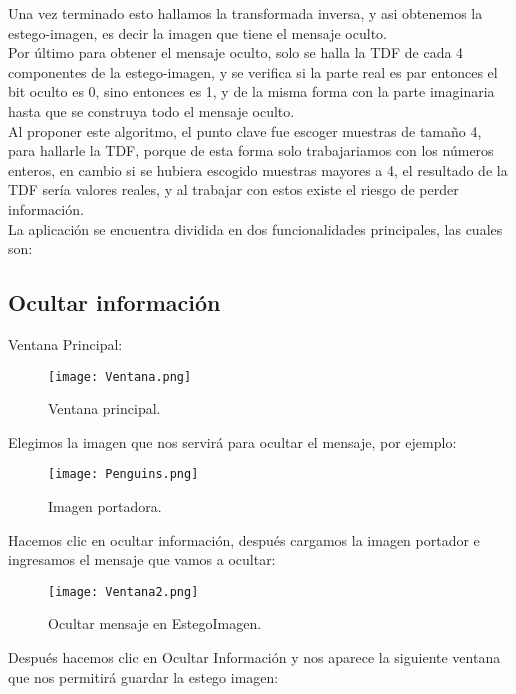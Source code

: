 \documentclass[a4paper]{article}
\begin{document}
Una vez terminado esto hallamos la transformada inversa, y asi obtenemos la estego-imagen, es decir la imagen que tiene el mensaje oculto.\\

Por último para obtener el mensaje oculto, solo se halla la TDF de cada 4 componentes de la estego-imagen, y se verifica si la parte real es par entonces el bit oculto es 0, sino entonces es 1, y de la misma forma con la parte imaginaria hasta que se construya todo el mensaje oculto.\\

Al proponer este algoritmo, el punto clave fue escoger muestras de tamaño 4, para hallarle la TDF, porque de esta forma solo trabajariamos con los números enteros, en cambio si se hubiera escogido muestras mayores a 4, el resultado de la TDF sería valores reales, y al trabajar con estos existe el riesgo de perder información. \\

La aplicación se encuentra dividida en dos funcionalidades principales, las cuales son:

\newpage

\subsection{Ocultar información}

Ventana Principal: 
\begin{figure}[htpb]
\centering
\texttt{[image: Ventana.png]}
\caption{\label{fig:ventana}Ventana principal.}
\end{figure}

Elegimos la imagen que nos servirá para ocultar el mensaje, por ejemplo:

\begin{figure}[htpb]
\centering
\texttt{[image: Penguins.png]}
\caption{\label{fig:penguins}Imagen portadora.}
\end{figure}

Hacemos clic en ocultar información, después cargamos la imagen portador e ingresamos el mensaje que vamos a ocultar:


\begin{figure}[htpb]
\centering
\texttt{[image: Ventana2.png]}
\caption{\label{fig:ventana2}Ocultar mensaje en EstegoImagen.}
\end{figure}

\newpage

Después hacemos clic en Ocultar Información y nos aparece la siguiente ventana que nos permitirá guardar la estego imagen:
\end{document}
